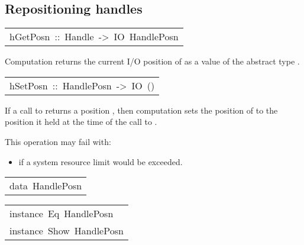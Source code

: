 \subsection{Repositioning handles
}
\begin{haddockdesc}
\item[\begin{tabular}{@{}l}
hGetPosn\ ::\ Handle\ ->\ IO\ HandlePosn
\end{tabular}]\haddockbegindoc
Computation   returns the current I/O position of
  as a value of the abstract type .
\par

\end{haddockdesc}
\begin{haddockdesc}
\item[\begin{tabular}{@{}l}
hSetPosn\ ::\ HandlePosn\ ->\ IO\ ()
\end{tabular}]\haddockbegindoc
If a call to   returns a position ,
 then computation   sets the position of 
 to the position it held at the time of the call to .
\par
This operation may fail with:
\par
\begin{itemize}
\item
  if a system resource limit would be exceeded.
\par

\end{itemize}

\end{haddockdesc}
\begin{haddockdesc}
\item[\begin{tabular}{@{}l}
data\ HandlePosn
\end{tabular}]
\end{haddockdesc}
\begin{haddockdesc}
\item[\begin{tabular}{@{}l}
instance\ Eq\ HandlePosn\\instance\ Show\ HandlePosn
\end{tabular}]
\end{haddockdesc}

